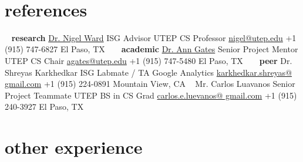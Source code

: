 \documentclass[]{friggeri-cv} %
\begin{document}
\newpage
\clearpage
\begin{aside2}
~
~
\section{references}
~
\textbf{research}
\href{http://www.cs.utep.edu/nigel/}{Dr. Nigel Ward}
ISG Advisor
UTEP CS Professor
\href{mailto:nigel@utep.edu}{nigel@utep.edu}
+1 (915) 747-6827
El Paso, TX
~
~
\textbf{academic}
\href{http://www.cs.utep.edu/agates/}{Dr. Ann Gates}
Senior Project Mentor
UTEP CS Chair
\href{mailto:agates@utep.edu}{agates@utep.edu}
+1 (915) 747-5480
El Paso, TX
~
~
\textbf{peer}
Dr. Shreyas Karkhedkar
ISG Labmate / TA
Google Analytics
\href{mailto:karkhedkar.shreyas@gmail.com}{karkhedkar.shreyas@
gmail.com}
+1 (915) 224-0891
Mountain View, CA
~
Mr. Carlos Luavanos
\small{Senior Project Teammate}
UTEP BS in CS Grad
\href{mailto:carlos.e.luevanos@gmail.com}{carlos.e.luevanos@
gmail.com}
+1 (915) 240-3927
El Paso, TX
\end{aside2}



\section{other experience}
\end{document}
